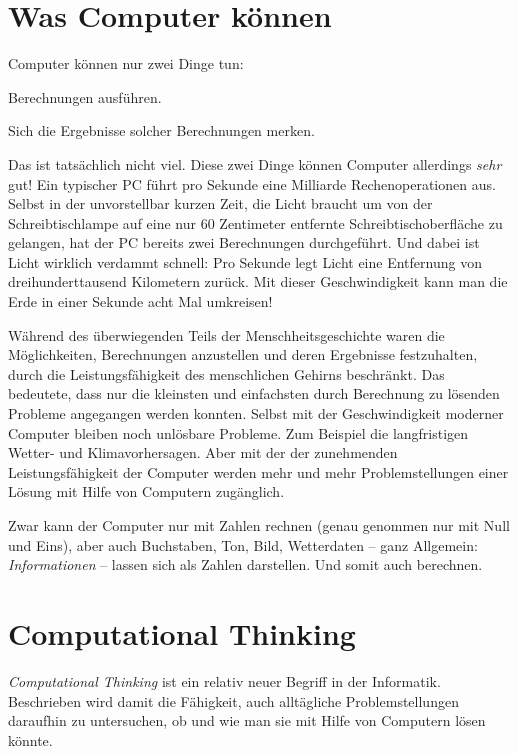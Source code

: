 \section{Was Computer können}

Computer können nur zwei Dinge tun:

\begin{compactenum}[1.]
\item Berechnungen ausführen.
\item Sich die Ergebnisse solcher Berechnungen merken. 
\end{compactenum}

Das ist tatsächlich nicht viel. Diese zwei Dinge können Computer allerdings
\emph{sehr} gut! Ein typischer PC führt pro Sekunde eine Milliarde
Rechenoperationen aus. Selbst in der unvorstellbar kurzen Zeit, die Licht
braucht um von der Schreibtischlampe auf eine nur 60 Zentimeter entfernte
Schreibtischoberfläche zu gelangen, hat der PC bereits zwei Berechnungen
durchgeführt. Und dabei ist Licht wirklich verdammt schnell: Pro Sekunde legt
Licht eine Entfernung von dreihunderttausend Kilometern zurück. Mit dieser
Geschwindigkeit kann man die Erde in einer Sekunde acht Mal umkreisen!

Während des überwiegenden Teils der Menschheitsgeschichte waren die
Möglichkeiten, Berechnungen anzustellen und deren Ergebnisse festzuhalten,
durch die Leistungsfähigkeit des menschlichen Gehirns beschränkt. Das bedeutete,
dass nur die kleinsten und einfachsten durch Berechnung zu lösenden Probleme
angegangen werden konnten. Selbst mit der Geschwindigkeit moderner Computer
bleiben noch unlösbare Probleme. Zum Beispiel die langfristigen Wetter- und
Klimavorhersagen. Aber mit der der zunehmenden Leistungsfähigkeit der Computer
werden mehr und mehr Problemstellungen einer Lösung mit Hilfe von Computern
zugänglich.

Zwar kann der Computer nur mit Zahlen rechnen (genau genommen nur mit Null und
Eins), aber auch Buchstaben, Ton, Bild, Wetterdaten -- ganz Allgemein:
\emph{Informationen} -- lassen sich als Zahlen darstellen. Und somit auch
berechnen.


\section{Computational Thinking}

\emph{Computational Thinking} ist ein relativ neuer Begriff in der Informatik.
Beschrieben wird damit die Fähigkeit, auch alltägliche Problemstellungen
daraufhin zu untersuchen, ob und wie man sie mit Hilfe von Computern lösen
könnte.

